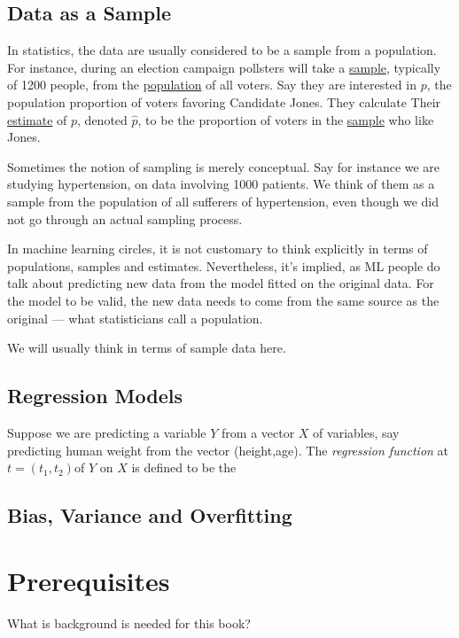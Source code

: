 \subsection{Data as a Sample}

In statistics, the data are usually considered to be a sample from a
population.  For instance, during an election campaign pollsters will
take a \underline{sample}, typically of 1200 people, from the
\underline{population} of all voters.  Say they are interested in $p$,
the population proportion of voters favoring Candidate Jones. They
calculate Their \underline{estimate} of $p$, denoted
$\widehat{p}$, to be the proportion of voters in the 
\underline{sample} who like Jones.

Sometimes the notion of sampling is merely conceptual. Say for instance
we are studying hypertension, on data involving 1000 patients.  We think
of them as a sample from the population of all sufferers of
hypertension, even though we did not go through an actual sampling
process.

In machine learning circles, it is not customary to think explicitly in
terms of populations, samples and estimates.  Nevertheless, it's
implied, as ML people do talk about predicting new data from the model
fitted on the original data.  For the model to be valid, the new data
needs to come from the same source as the original --- what
statisticians call a population.

We will usually think in terms of sample data here.

\subsection{Regression Models} 

Suppose we are predicting a variable $Y$ from a vector $X$ of variables,
say predicting human weight from the vector (height,age).  The
\textit{regression function} at $t = (t_1,t_2)$of $Y$ on $X$ is defined
to be the 

\subsection{Bias, Variance and Overfitting}

\section{Prerequisites}

What is background is needed for this book?

